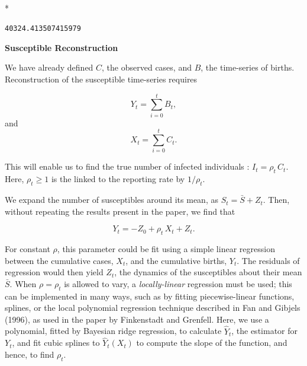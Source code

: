 \documentclass[letterpaper,10pt,english]{/Users/qcaudron/anaconda/lib/python2.7/site-packages/Sphinx-1.2b1-py2.7.egg/sphinx/texinputs/sphinxhowto}
\def\smaller{\fontsize{9.5pt}{9.5pt}\selectfont}
\newenvironment{InvisibleVerbatim}
        {\begin{mdframed}[leftmargin=0.1\linewidth,innerleftmargin=3pt,innerrightmargin=3pt, userdefinedwidth=1\linewidth, linewidth=0pt, linecolor=white, usetwoside=false]}
        {\end{mdframed}}
\begin{document}
    

        
        

            
                \makebox[0.1\linewidth]{\smaller\hfill\tt\color{nbframe-out-prompt}Out\hspace{4pt}{[}13{]}:\hspace{4pt}}\\*
                \vspace{-2.55\baselineskip}\begin{InvisibleVerbatim}
                \vspace{-0.5\baselineskip}
\begin{alltt}40324.413507415979\end{alltt}

            \end{InvisibleVerbatim}
            
        
    
\textbf{Susceptible Reconstruction}

We have already defined $C$, the observed cases, and $B$, the
time-series of births. Reconstruction of the susceptible time-series
requires

\[
Y_t = \sum_{i=0}^t B_t, 
\] and \[
X_t = \sum_{i=0}^t C_t.
\]

This will enable us to find the true number of infected individuals :
$I_t = \rho_t \, C_t.$ Here, $\rho_t \ge 1$ is the linked to the
reporting rate by $1/\rho_t$.

We expand the number of susceptibles around its mean, as
$S_t = \bar{S} + Z_t$. Then, without repeating the results present in
the paper, we find that

\[
Y_t = -Z_0 + \rho_t \, X_t + Z_t.
\]

For constant $\rho$, this parameter could be fit using a simple linear
regression between the cumulative cases, $X_t$, and the cumulative
births, $Y_t$. The residuals of regression would then yield $Z_t$, the
dynamics of the susceptibles about their mean $\bar{S}$. When
$\rho = \rho_t$ is allowed to vary, a \emph{locally-linear} regression
must be used; this can be implemented in many ways, such as by fitting
piecewise-linear functions, splines, or the local polynomial regression
technique described in Fan and Gibjels (1996), as used in the paper by
Finkenstadt and Grenfell. Here, we use a polynomial, fitted by Bayesian
ridge regression, to calculate $\hat{Y}_t$, the estimator for $Y_t$, and
fit cubic splines to $\hat{Y}_t(X_t)$ to compute the slope of the
function, and hence, to find $\rho_t$.
\end{document}
